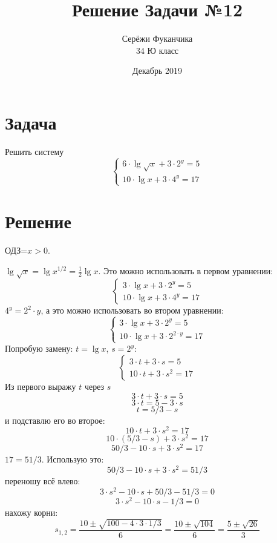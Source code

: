 \documentclass{article}
\title{Решение Задачи №12}
\author{Серёжи Фуканчика\\34 Ю класс}
\date{Декабрь 2019}
\begin{document}
\maketitle

\section{Задача}
Решить систему
\begin{equation*}
    \begin{cases} 
    6\cdot\lg{\sqrt{x}}+3\cdot{}2^y=5 \\ 10\cdot\lg{x}+3\cdot{}4^y=17
    \end{cases}
\end{equation*}

\section{Решение}
ОДЗ=$x>0$.

$\lg{\sqrt{x}}=\lg{x^{1/2}}=\frac{1}{2}\lg{x}$. Это можно использовать в первом уравнении:
\begin{equation*}
    \begin{cases} 
    3\cdot\lg{x}+3\cdot{}2^y=5 \\ 10\cdot\lg{x}+3\cdot{}4^y=17
    \end{cases}
\end{equation*}
$4^y=2^2\cdot{}y$, а это можно использовать во втором уравнении:
\begin{equation*}
    \begin{cases} 
    3\cdot\lg{x}+3\cdot{}2^y=5 \\ 10\cdot\lg{x}+3\cdot{}2^{2\cdot{}y}=17
    \end{cases}
\end{equation*}
Попробую замену: $t=\lg{x}$, $s=2^y$:
\begin{equation*}
    \begin{cases} 
    3\cdot{}t+3\cdot{}s=5 \\ 10\cdot{}t+3\cdot{}s^2=17
    \end{cases}
\end{equation*}
Из первого выражу $t$ через $s$
$$3\cdot{}t+3\cdot{}s=5$$
$$3\cdot{}t=5-3\cdot{}s$$
$$t=5/3-s$$
и подставлю его во второе:
$$10\cdot{}t+3\cdot{}s^2=17$$
$$10\cdot{}(5/3-s)+3\cdot{}s^2=17$$
$$50/3-10\cdot{}s+3\cdot{}s^2=17$$
$17=51/3$. Использую это:
$$50/3-10\cdot{}s+3\cdot{}s^2=51/3$$
переношу всё влево:
$$3\cdot{}s^2-10\cdot{}s+50/3-51/3=0$$
$$3\cdot{}s^2-10\cdot{}s-1/3=0$$
нахожу корни:
$$s_{1,2}=\frac{10\pm{}\sqrt{100-4\cdot{}3\cdot{}1/3}}{6}=\frac{10\pm{}\sqrt{104}}{6}=\frac{5\pm{}\sqrt{26}}{3}$$
\end{document}
